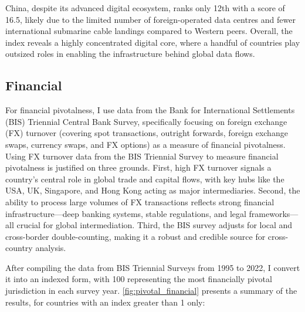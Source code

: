 \documentclass[11pt]{article}
\begin{document}
China, despite its advanced digital ecosystem, ranks only 12th with a score of 16.5, likely due to the limited number of foreign-operated data centres and fewer international submarine cable landings compared to Western peers. Overall, the index reveals a highly concentrated digital core, where a handful of countries play outsized roles in enabling the infrastructure behind global data flows.

\subsection{Financial}

For financial pivotalness, I use data from the Bank for International Settlements (BIS) Triennial Central Bank Survey, specifically focusing on foreign exchange (FX) turnover (covering spot transactions, outright forwards, foreign exchange swaps, currency swaps, and FX options) as a measure of financial pivotalness. Using FX turnover data from the BIS Triennial Survey to measure financial pivotalness is justified on three grounds. First, high FX turnover signals a country’s central role in global trade and capital flows, with key hubs like the USA, UK, Singapore, and Hong Kong acting as major intermediaries. Second, the ability to process large volumes of FX transactions reflects strong financial infrastructure—deep banking systems, stable regulations, and legal frameworks—all crucial for global intermediation. Third, the BIS survey adjusts for local and cross-border double-counting, making it a robust and credible source for cross-country analysis.

After compiling the data from BIS Triennial Surveys from 1995 to 2022, I convert it into an indexed form, with 100 representing the most financially pivotal jurisdiction in each survey year. \ref{fig:pivotal_financial} presents a summary of the results, for countries with an index greater than 1 only:
\end{document}
